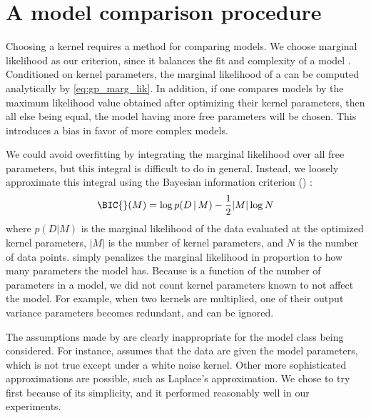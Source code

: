 \section{A model comparison procedure}

Choosing a kernel requires a method for comparing models.
We choose marginal likelihood as our criterion, since it balances the fit and complexity of a model \citep{rasmussen2001occam}.
Conditioned on kernel parameters, the marginal likelihood of a \gp{} can be computed analytically by \cref{eq:gp_marg_lik}.
In addition, if one compares \gp{} models by the maximum likelihood value obtained after optimizing their kernel parameters, then all else being equal, the model having more free parameters will be chosen.
This introduces a bias in favor of more complex models.

We could avoid overfitting by integrating the marginal likelihood over all free parameters, but this integral is difficult to do in general.
Instead, we loosely approximate this integral using the Bayesian information criterion (\BIC{}) \citep{schwarz1978estimating}:
%
\begin{equation}
\BIC{}(M) = \log p(D \given M) - \frac{1}{2} |M| \log N
\end{equation}
%
where $p(D|M)$ is the marginal likelihood of the data evaluated at the optimized kernel parameters, $|M|$ is the number of kernel parameters, and $N$ is the number of data points.
\BIC{} simply penalizes the marginal likelihood in proportion to how many parameters the model has.
Because \BIC{} is a function of the number of parameters in a model, we did not count kernel parameters known to not affect the model.
For example, when two kernels are multiplied, one of their output variance parameters becomes redundant, and can be ignored.

The assumptions made by \BIC{} are clearly inappropriate for the model class being considered.
For instance, \BIC{} assumes that the data are \iid given the model parameters, which is not true except under a white noise kernel.
Other more sophisticated approximations are possible, such as Laplace's approximation.
We chose to try \BIC{} first because of its simplicity, and it performed reasonably well in our experiments.




